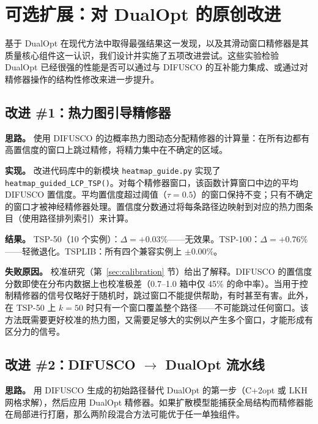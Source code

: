 \documentclass[11pt,a4paper]{ctexart}
\begin{document}
\section{可选扩展：对 DualOpt 的原创改进}
\label{sec:improvements}

基于 DualOpt 在现代方法中取得最强结果这一发现，以及其滑动窗口精修器是其质量核心组件这一认识，我们设计并实施了五项改进尝试。这些实验检验 DualOpt 已经很强的性能是否可以通过与 DIFUSCO 的互补能力集成、或通过对精修器操作的结构性修改来进一步提升。

\subsection{改进 \#1：热力图引导精修器}
\label{sec:imp1}

\textbf{思路。} 使用 DIFUSCO 的边概率热力图动态分配精修器的计算量：在所有边都有高置信度的窗口上跳过精修，将精力集中在不确定的区域。

\textbf{实现。} 改进代码库中的新模块 \texttt{heatmap\_guide.py} 实现了 \texttt{heatmap\_guided\_LCP\_TSP()}。对每个精修器窗口，该函数计算窗口中边的平均 DIFUSCO 置信度。平均置信度超过阈值（$\tau = 0.5$）的窗口保持不变；只有不确定的窗口才被神经精修器处理。置信度分数通过将每条路径边映射到对应的热力图条目（使用路径排列索引）来计算。

\textbf{结果。} TSP-50（10 个实例）：$\Delta = +0.03\%$——无效果。TSP-100：$\Delta = +0.76\%$——轻微退化。TSPLIB：所有四个兼容实例上 $\pm 0.00\%$。

\textbf{失败原因。} 校准研究（第~\ref{sec:calibration} 节）给出了解释。DIFUSCO 的置信度分数即使在分布内数据上也校准极差（0.7--1.0 箱中仅 45\% 的命中率）。当用于控制精修器的信号仅略好于随机时，跳过窗口不能提供帮助，有时甚至有害。此外，在 TSP-50 上 $k=50$ 时只有一个窗口覆盖整个路径——不可能跳过任何窗口。该方法既需要更好校准的热力图，又需要足够大的实例以产生多个窗口，才能形成有区分力的信号。

\subsection{改进 \#2：DIFUSCO $\rightarrow$ DualOpt 流水线}
\label{sec:imp2}

\textbf{思路。} 用 DIFUSCO 生成的初始路径替代 DualOpt 的第一步（C+2opt 或 LKH 网格求解），然后应用 DualOpt 精修器。如果扩散模型能捕获全局结构而精修器能在局部进行打磨，那么两阶段混合方法可能优于任一单独组件。
\end{document}
